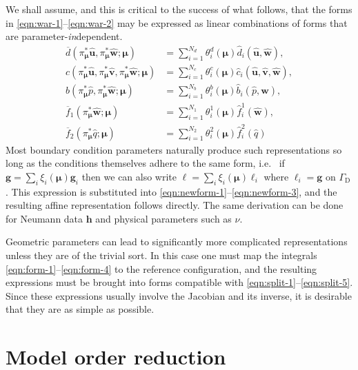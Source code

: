 \documentclass[onecolumn, twoside, a4paper, 11pt]{article}
\begin{document}
We shall assume, and this is critical to the success of what follows, that the
forms in \eqref{eqn:war-1}--\eqref{eqn:war-2} may be expressed as linear
combinations of forms that are parameter-\emph{in}dependent.
\begin{align}
  \overline{d}(
    \pi_{\bm \mu}^* \hat{\bm u},
    \pi_{\bm \mu}^* \hat{\bm w};
    \bm \mu
  ) &= \sum_{i=1}^{N_d} \theta^d_i(\bm \mu) \hat{d}_i(\hat{\bm u}, \hat{\bm w}), \label{eqn:split-1} \\
  c(
    \pi_{\bm \mu}^* \hat{\bm u},
    \pi_{\bm \mu}^* \hat{\bm v},
    \pi_{\bm \mu}^* \hat{\bm w};
    \bm \mu
  ) &= \sum_{i=1}^{N_c} \theta^c_i(\bm \mu)
      \hat{c}_i(\hat{\bm u}, \hat{\bm v}, \hat{\bm w}), \label{eqn:split-2} \\
  b(
    \pi_{\bm \mu}^* \hat{p},
    \pi_{\bm \mu}^* \hat{\bm w};
    \bm \mu
  ) &= \sum_{i=1}^{N_b} \theta^b_i(\bm \mu) \hat{b}_i(\hat{p}, \hat{\bm w}), \label{eqn:split-3} \\
  \overline{f}_1(
    \pi_{\bm \mu}^* \hat{\bm w};
    \bm \mu
  ) &= \sum_{i=1}^{N_1} \theta^1_i(\bm \mu) \hat{f}^1_i(\hat{\bm w}), \label{eqn:split-4} \\
  \overline{f}_2(
    \pi_{\bm \mu}^* \hat{q};
    \bm \mu
  ) &= \sum_{i=1}^{N_2} \theta^2_i(\bm \mu) \hat{f}^2_i(\hat{q}) \label{eqn:split-5}
\end{align}
Most boundary condition parameters naturally produce such representations so
long as the conditions themselves adhere to the same form, i.e.~ if
$\bm g = \sum_i \xi_i(\bm \mu) \bm g_i$ then we can also write
$\bm \ell = \sum_i \xi_i(\bm \mu) \bm \ell_i$ where $\bm \ell_i = \bm g$ on
$\Gamma_\text{D}$. This expression is substituted into
\eqref{eqn:newform-1}--\eqref{eqn:newform-3}, and the resulting affine
representation follows directly. The same derivation can be done for Neumann
data $\bm h$ and physical parameters such as $\nu$.

Geometric parameters can lead to significantly more complicated representations
unless they are of the trivial sort. In this case one must map the integrals
\eqref{eqn:form-1}--\eqref{eqn:form-4} to the reference configuration, and the
resulting expressions must be brought into forms compatible with
\eqref{eqn:split-1}--\eqref{eqn:split-5}. Since these expressions usually
involve the Jacobian and its inverse, it is desirable that they are as simple as
possible.

\section{Model order reduction}
\label{sec:reduction}
\end{document}
